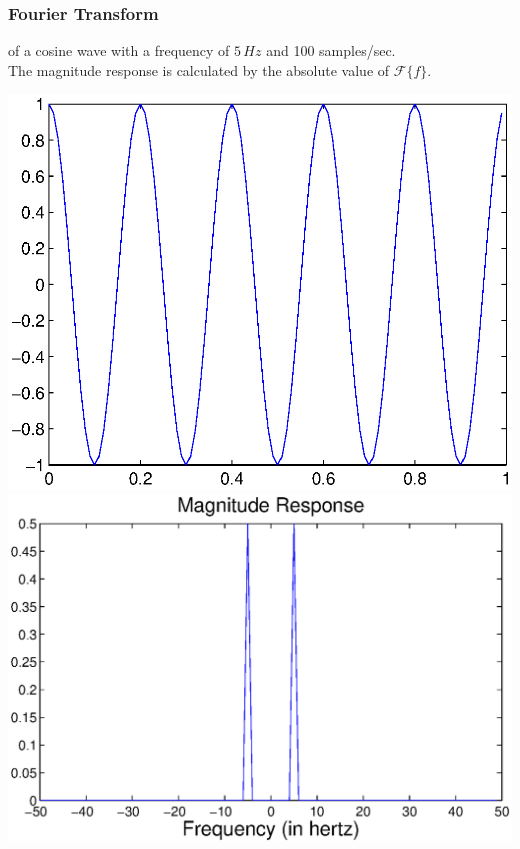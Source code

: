 \begin{frame}
    \frametitle{Fourier Transform}
    \myExample of a cosine wave with a frequency of $5\,Hz$ and 100 samples/sec.\\
    The magnitude response is calculated by the absolute value of $\mathcal{F}\{f\}$.

    \begin{center}
        \includegraphics[height=.65\textheight ]{images/fourier1}\includegraphics[height=.65\textheight ]{images/fourier2}
    \end{center}
\end{frame}



